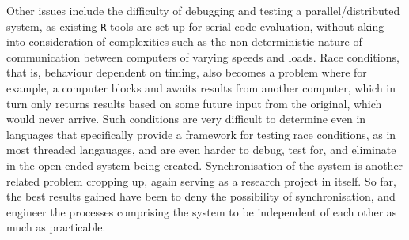 Other issues include the difficulty of debugging and testing a parallel/distributed system, as existing \texttt{R} tools are set up for serial code evaluation, without aking into consideration of complexities such as the non-deterministic nature of communication between computers of varying speeds and loads.
Race conditions, that is, behaviour dependent on timing, also becomes a problem where for example, a computer blocks and awaits results from another computer, which in turn only returns results based on some future input from the original, which would never arrive.
Such conditions are very difficult to determine even in languages that specifically provide a framework for testing race conditions, as in most threaded langauages, and are even harder to debug, test for, and eliminate in the open-ended system being created\cite{serebryany2009threadsanitizer}.
Synchronisation of the system is another related problem cropping up, again serving as a research project in itself.
So far, the best results gained have been to deny the possibility of synchronisation, and engineer the processes comprising the system to be independent of each other as much as practicable.
